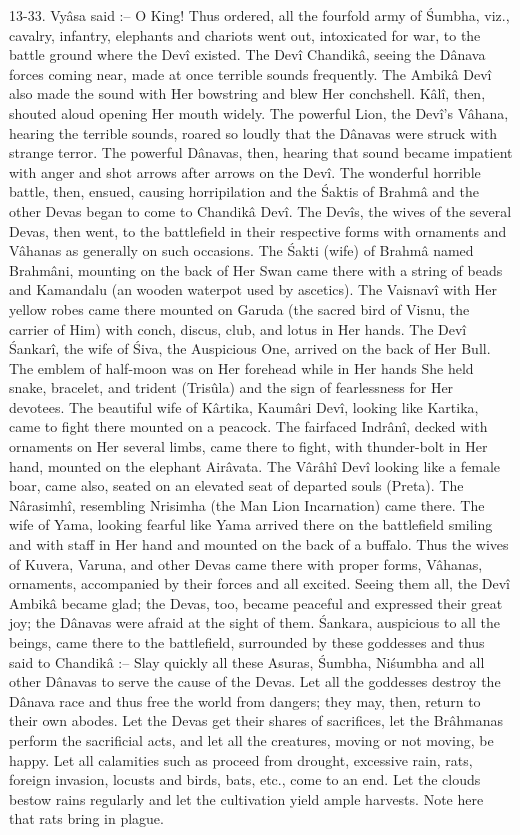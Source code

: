 13-33. Vy\^asa said :-- O King! Thus ordered, all the fourfold army of \'Sumbha, viz., cavalry, infantry, elephants and chariots went out, intoxicated for war, to the battle ground where the Dev\^i existed. The Dev\^i Chandik\^a, seeing the D\^anava forces coming near, made at once terrible sounds frequently. The Ambik\^a Dev\^i also made the sound with Her bowstring and blew Her conchshell. K\^al\^i, then, shouted aloud opening Her mouth widely. The powerful Lion, the Dev\^i's V\^ahana, hearing the terrible sounds, roared so loudly that the D\^anavas were struck with strange terror. The powerful D\^anavas, then, hearing that sound became impatient with anger and shot arrows after arrows on the Dev\^i. The wonderful horrible battle, then, ensued, causing horripilation and the \'Saktis of Brahm\^a and the other Devas began to come to Chandik\^a Dev\^i. The Dev\^is, the wives of the several Devas, then went, to the battlefield in their respective forms with ornaments and V\^ahanas as generally on such occasions. The \'Sakti (wife) of Brahm\^a named Brahm\^ani, mounting on the back of Her Swan came there with a string of beads and Kamandalu (an wooden waterpot used by ascetics). The Vaisnav\^i with Her yellow robes came there mounted on Garuda (the sacred bird of Visnu, the carrier of Him) with conch, discus, club, and lotus in Her hands. The Dev\^i \'Sankar\^i, the wife of \'Siva, the Auspicious One, arrived on the back of Her Bull. The emblem of half-moon was on Her forehead while in Her hands She held snake, bracelet, and trident (Tris\^ula) and the sign of fearlessness for Her devotees. The beautiful wife of K\^artika, Kaum\^ari Dev\^i, looking like Kartika, came to fight there mounted on a peacock. The fairfaced Indr\^an\^i, decked with ornaments on Her several limbs, came there to fight, with thunder-bolt in Her hand, mounted on the elephant Air\^avata. The V\^ar\^ah\^i Dev\^i looking like a female boar, came also, seated on an elevated seat of departed souls (Preta). The N\^arasimh\^i, resembling Nrisimha (the Man Lion Incarnation) came there. The wife of Yama, looking fearful like Yama arrived there on the battlefield smiling and with staff in Her hand and mounted on the back of a buffalo. Thus the wives of Kuvera, Varuna, and other Devas came there with proper forms, V\^ahanas, ornaments, accompanied by their forces and all excited. Seeing them all, the Dev\^i Ambik\^a became glad; the Devas, too, became peaceful and expressed their great joy; the D\^anavas were afraid at the sight of them. \'Sankara, auspicious to all the beings, came there to the battlefield, surrounded by these goddesses and thus said to Chandik\^a :-- Slay quickly all these Asuras, \'Sumbha, Ni\'sumbha and all other D\^anavas to serve the cause of the Devas. Let all the goddesses destroy the D\^anava race and thus free the world from dangers; they may, then, return to their own abodes. Let the Devas get their shares of sacrifices, let the Br\^ahmanas perform the sacrificial acts, and let all the creatures, moving or not moving, be happy. Let all calamities such as proceed from drought, excessive rain, rats, foreign invasion, locusts and birds, bats, etc., come to an end. Let the clouds bestow rains regularly and let the cultivation yield ample harvests. Note here that rats bring in plague.

